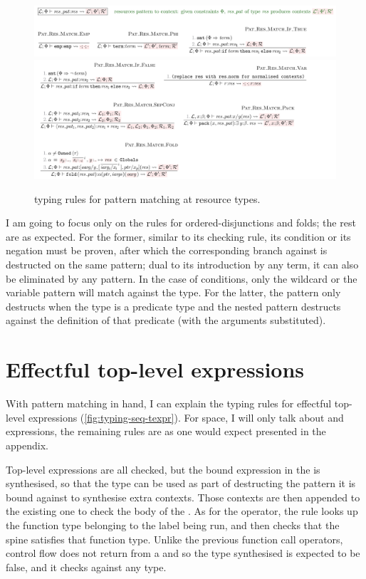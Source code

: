 \begin{figure}[tp]
    \includegraphics{figures/kernel-res-pat-typing-1}
    \includegraphics{figures/kernel-res-pat-typing-2}
    \caption{ typing rules for pattern matching at resource
        types.}\label{fig:typing-res-pat}
\end{figure}

I am going to focus only on the rules for ordered-disjunctions and folds; the
rest are as expected. For the former, similar to its checking rule, its
condition or its negation must be proven, after which the corresponding branch
against is destructed on the same pattern; dual to its introduction by any
term, it can also be eliminated by any pattern. In the case of
 conditions, only the wildcard or the variable pattern
will match against the type. For the latter, the pattern only destructs when
the type is a predicate type and the nested pattern destructs against the
definition of that predicate (with the arguments substituted).

\section{Effectful top-level expressions}

With pattern matching in hand, I can explain the typing rules for effectful
top-level expressions (\cref{fig:typing-seq-texpr}). For space, I will
only talk about  and  expressions, %
the remaining rules are as one would expect presented in the appendix.

Top-level expressions are all checked, but the bound expression in the
 is synthesised, so that the type can be used as part of
destructing the pattern it is bound against to synthesise extra contexts. Those
contexts are then appended to the existing one to check the body of the
. As for the  operator, the rule %
looks up the function type belonging to the label being run, and then checks
that the spine satisfies that function type. Unlike the previous function call
operators, control flow does not return from a  %
and so the type synthesised is expected to be false, and it checks against any
type.

